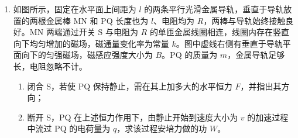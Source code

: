 \documentclass[\gkver]{gaokaozhenti}
\begin{document}
\begin{enumerate}
{$\frac{v}{2}=\frac{L_{1}}{t}$①，

由动能定理得

$W=\frac{1}{2}mv^{2}-0$②，

联立①②式，代入数据，得

$W = 7.5 \times 10^{4}\UJ$③。

（2）设上翘甲板所对应的圆弧半径为 $R$，由几何关系得

$L_{2}=R\sin\theta$④，

由牛顿第二定律得

$F_{N}-mg=m\frac{v^{2}}{R}$⑤，

联立①④⑤式，代入数据得

$F_{N}=1.1\times10^{3}\UN$⑥。
}

\item
如图所示，固定在水平面上间距为 $l$ 的两条平行光滑金属导轨，垂直于导轨放置的两根金属棒 MN 和 PQ 长度也为 $l$、电阻均为 $R$，两棒与导轨始终接触良好。MN 两端通过开关 S 与电阻为 $R$ 的单匝金属线圈相连，线圈内存在竖直向下均匀增加的磁场，磁通量变化率为常量 $k$。图中虚线右侧有垂直于导轨平面向下的匀强磁场，磁感应强度大小为 $B$。PQ 的质量为 $m$，金属导轨足够长，电阻忽略不计。
\begin{enumerate}
	\item
	闭合 S，若使 PQ 保持静止，需在其上加多大的水平恒力 $F$，并指出其方向；
	\item
	断开 S，PQ 在上述恒力作用下，由静止开始到速度大小为 $v$ 的加速过程中流过 PQ 的电荷量为 $q$，求该过程安培力做的功 $W$。
\end{enumerate}
\end{enumerate}
\end{document}
